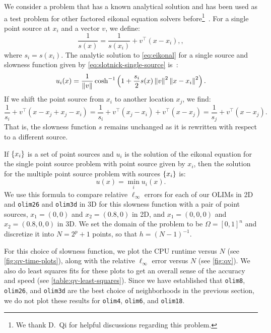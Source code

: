 \documentclass[sisc-eikonal.tex]{subfiles}
\begin{document}
We consider a problem that has a known analytical solution and has
been used as a test problem for other factored eikonal equation
solvers before\footnote{We thank D.\ Qi for helpful discussions
  regarding this
  problem.}~\cite{slotnick1959lessons,fomel2009fast,qi2018corner}. For
a single point source at $x_i$ and a vector $v$, we define:
\begin{equation}
  \label{eq:slotnick-single-source}
  \frac{1}{s(x)} = \frac{1}{s(x_i)} + v^\top {(x - x_i)},,
\end{equation}
where $s_i = s(x_i)$. The analytic solution to \cref{eq:eikonal} for a
single source and slowness function given by
\cref{eq:slotnick-single-source} is~\cite{slotnick1959lessons}:
\begin{equation}
  \label{eq:slotnick-single-source-solution}
  u_i(x) = \frac{1}{\norm{v}} \cosh^{-1} \parens{1 + \frac{s_i}{2} s(x) \norm{v}^2 \norm{x - x_i}^2}.
\end{equation}
If we shift the point source from $x_i$ to another location $x_j$, we
find:
\begin{equation}
  \label{eq:slotnick-slowness-shift}
  \frac{1}{s_i} + v^\top {(x - x_j + x_j - x_i)} = \frac{1}{s_i} + v^\top {(x_j - x_i)} + v^\top {(x - x_j)} = \frac{1}{s_j} + v^\top {(x - x_j)}.
\end{equation}
That is, the slowness function $s$ remains unchanged as it is
rewritten with respect to a different source.

If $\left\{x_i\right\}$ is a set of point sources and $u_i$ is the solution of
the eikonal equation for the single point source problem with point
source given by $x_i$, then the solution for the multiple point source
problem with sources $\left\{x_i\right\}$ is:
\begin{equation}
  u(x) = \min_i u_i(x).
\end{equation}
We use this formula to compare relative $\ell_\infty$ errors for each
of our OLIMs in 2D and \texttt{olim26} and \texttt{olim3d} in 3D for
this slowness function with a pair of point sources, $x_1 = (0, 0)$
and $x_2 = (0.8, 0)$ in 2D, and $x_1 = (0, 0, 0)$ and
$x_2 = (0.8, 0, 0)$ in 3D. We set the domain of the problem to be
$\Omega = [0, 1]^n$ and discretize it into $N = 2^p + 1$ points, so
that $h = (N-1)^{-1}$.

For this choice of slowness function, we plot the CPU runtime versus
$N$ (see \cref{fig:qv-time-plots}), along with the relative
$\ell_\infty$ error versus $N$ (see \cref{fig:qv}). We also do least
squares fits for these plots to get an overall sense of the accuracy
and speed (see \cref{table:qv-least-squares}). Since we have
established that \texttt{olim8}, \texttt{olim26}, and \texttt{olim3d}
are the best choice of neighborhoods in the previous section, we do
not plot these results for \texttt{olim4}, \texttt{olim6}, and
\texttt{olim18}.
\end{document}
